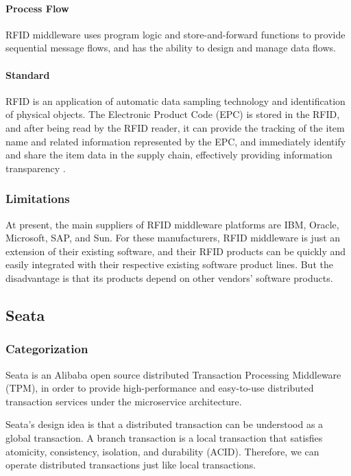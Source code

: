 \documentclass[conference]{IEEEtran}
\begin{document}
\paragraph{Process Flow}
RFID middleware uses program logic and store-and-forward functions to provide sequential message flows, and has the ability to design and manage data flows.

\paragraph{Standard}
RFID is an application of automatic data sampling technology and identification of physical objects. The Electronic Product Code (EPC) is stored in the RFID, and after being read by the RFID reader, it can provide the tracking of the item name and related information represented by the EPC, and immediately identify and share the item data in the supply chain, effectively providing information transparency .

\subsubsection{Limitations}
 At present, the main suppliers of RFID middleware platforms are IBM, Oracle, Microsoft, SAP, and Sun. For these manufacturers, RFID middleware is just an extension of their existing software, and their RFID products can be quickly and easily integrated with their respective existing software product lines. But the disadvantage is that its products depend on other vendors' software products.
 
 
 \subsection{Seata}
\subsubsection{Categorization}
Seata is an Alibaba open source distributed Transaction Processing Middleware (TPM), in order to provide high-performance and easy-to-use distributed transaction services under the microservice architecture.

Seata's design idea is that a distributed transaction can be understood as a global transaction. A branch transaction is a local transaction that satisfies atomicity, consistency, isolation, and durability (ACID). Therefore, we can operate distributed transactions just like local transactions.
\end{document}
